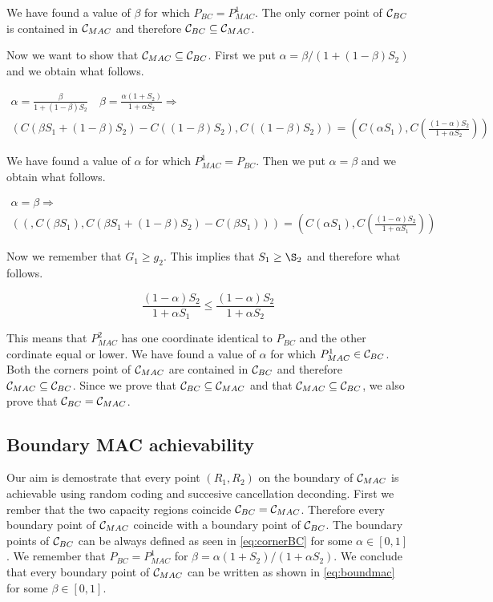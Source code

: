 We have found a value of $\beta$ for which $P_{BC} = P_{MAC}^1$. The only corner point of $\mathcal{C}_{BC}$ is contained in $\mathcal{C}_{MAC}$ and therefore $\mathcal{C}_{BC} \subseteq \mathcal{C}_{MAC}$.

Now we want to show that $\mathcal{C}_{MAC} \subseteq \mathcal{C}_{BC}$. First we put $\alpha = \beta / (1+(1-\beta)S_2)$ and we obtain what follows.

\begin{gather*}
	\alpha = \frac{\beta}{1+ (1-\beta) S_2} \quad \beta = \frac{\alpha(1+S_2)}{1+\alpha S_2}  \Rightarrow \\
	\left( C (\beta S_1 + (1-\beta)S_2) - C((1-\beta)S_2) , C \left( (1-\beta)S_2 \right) \right)
	= \left( C(\alpha S_1) , C \left( \frac{(1-\alpha)S_2}{1+\alpha S_2} \right) \right)
\end{gather*}

We have found a value of $\alpha$ for which $P_{MAC}^1 = P_{BC}$. Then we put $\alpha = \beta$ and we obtain what follows.

\begin{gather*}
	\alpha = \beta \Rightarrow \\
	(\left( , C \left(\beta S_1 \right), C (\beta S_1 + (1-\beta)S_2) - C(\beta S_1) \right)) =  \left( C \left(\alpha S_1 \right), C \left( \frac{(1-\alpha)S_2}{1 + \alpha S_1}\right) \right)
\end{gather*}

Now we remember that $G_1 \geq g_2$. This implies that $S_1 \geq \S_2$ and therefore what follows.

\begin{equation}
	\frac{(1-\alpha)S_2}{1 + \alpha S_1} \leq \frac{(1-\alpha)S_2}{1 + \alpha S_2}
\end{equation}

This means that $P_{MAC}^2$ has one coordinate identical to $P_{BC}$ and the other cordinate equal or lower. We have found a value of $\alpha$ for which $P_{MAC}^1 \in \mathcal{C}_{BC}$. Both the corners point of $\mathcal{C}_{MAC}$ are contained in $\mathcal{C}_{BC}$ and therefore $\mathcal{C}_{MAC} \subseteq \mathcal{C}_{BC}$. Since we prove that $\mathcal{C}_{BC} \subseteq \mathcal{C}_{MAC}$ and that $\mathcal{C}_{MAC} \subseteq \mathcal{C}_{BC}$, we also prove that $\mathcal{C}_{BC}=\mathcal{C}_{MAC}$.

\subsection{Boundary MAC achievability}

Our aim is demostrate that every point $(R_1,R_2)$ on the boundary of $\mathcal{C}_{MAC}$ is achievable using random coding and succesive cancellation deconding. First we rember that the two capacity regions coincide $\mathcal{C}_{BC}=\mathcal{C}_{MAC}$. Therefore every boundary point of $\mathcal{C}_{MAC}$ coincide with a boundary point of $\mathcal{C}_{BC}$. The boundary points of $\mathcal{C}_{BC}$ can be always defined as seen in \eqref{eq:cornerBC} for some $\alpha \in [0,1]$. We remember that $P_{BC} = P_{MAC}^1$ for $\beta = \alpha(1+S_2)/(1+\alpha S_2)$. We conclude that every boundary point of $\mathcal{C}_{MAC}$ can be written as shown in \eqref{eq:boundmac} for some $\beta \in [0,1]$.


